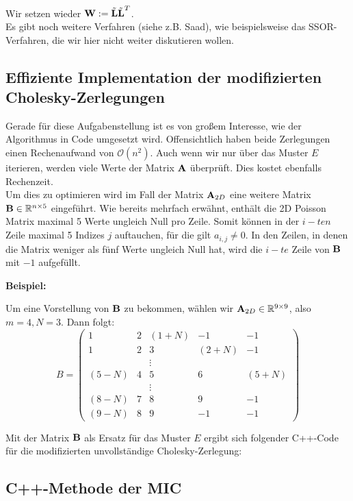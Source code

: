 Wir setzen wieder ${\textbf{W}} := \tilde{{\textbf{L}}} \tilde{{\textbf{L}}}^{T}$. \\
Es gibt noch weitere Verfahren (siehe z.B. Saad), wie beispielsweise das SSOR-Verfahren, die wir hier nicht weiter diskutieren wollen.

\subsection{Effiziente Implementation der modifizierten Cholesky-Zerlegungen}

Gerade für diese Aufgabenstellung ist es von großem Interesse, wie der Algorithmus in Code umgesetzt wird. Offensichtlich haben beide Zerlegungen einen Rechenaufwand von $\mathcal{O}(n^{2})$. Auch wenn wir nur über das Muster $E$ iterieren, werden viele Werte der Matrix ${\textbf{A}}$ überprüft. Dies kostet ebenfalls Rechenzeit.\\
Um dies zu optimieren wird im Fall der Matrix ${\textbf{A}}_{2D}$ eine weitere Matrix ${\textbf{B}} \in \mathbb{R}^{n \times 5}$ eingeführt. Wie bereits mehrfach erwähnt, enthält die 2D Poisson Matrix maximal 5 Werte ungleich Null pro Zeile. Somit können in der $i - ten$ Zeile maximal 5 Indizes $j$ auftauchen, für die gilt $a_{i,j} \ne 0$. In den Zeilen, in denen die Matrix weniger als fünf Werte ungleich Null hat, wird die $i - te$ Zeile von ${\textbf{B}}$ mit $-1$ aufgefüllt.

\textbf{Beispiel:}

Um eine Vorstellung von ${\textbf{B}}$ zu bekommen, wählen wir ${\textbf{A}}_{2D} \in \mathbb{R}^{9 \times 9}$, also $m = 4, N = 3$. Dann folgt:
\begin{equation}
B = 
\begin{pmatrix}
1 & 2 & (1+N) & -1 & -1\\
1 & 2 & 3 & (2+N) & -1\\
  &   & \vdots & &\\
(5-N) & 4 & 5 & 6 & (5+N)\\
  &   & \vdots & &\\
(8-N) & 7 & 8 & 9 & -1\\
(9-N) & 8 & 9 & -1 & -1
\end{pmatrix}
\end{equation}

Mit der Matrix ${\textbf{B}}$ als Ersatz für das Muster $E$ ergibt sich folgender C++-Code für die modifizierten unvollständige Cholesky-Zerlegung:

\subsection{C++-Methode der MIC}\label{s.MIC}


